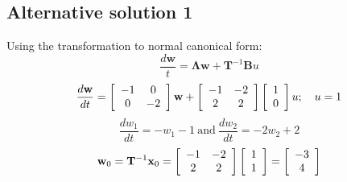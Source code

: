  

\subsection*{Alternative solution 1}
Using the transformation to normal canonical form:
\[
\frac{d\mathbf{w}}{t}=\mathbf{\Lambda w}+ \mathbf{T}^{-1}\mathbf{B}u
\]
\[
\frac{{d{\bf{w}}}}{{dt}} = \left[ {\begin{array}{*{20}c}
   { - 1} & 0  \\
   0 & { - 2}  \\
\end{array}} \right]{\bf{w}} + \left[ {\begin{array}{*{20}c}
   { - 1} & { - 2}  \\
   2 & 2  \\
\end{array}} \right]\left[ {\begin{array}{*{20}c}
   1  \\
   0  \\
\end{array}} \right]u;\quad u = 1
\]
\[
\frac{dw_1}{dt}=-w_1-1\ \textrm{and}\ \frac{dw_2}{dt}=-2w_2 + 2
\]
\[
{\bf{w}}_0  = {\bf{T}}^{ - 1} {\bf{x}}_0  = \left[ {\begin{array}{*{20}c}
   { - 1} & { - 2}  \\
   2 & 2  \\
\end{array}} \right]\left[ {\begin{array}{*{20}c}
   1  \\
   1  \\
\end{array}} \right] = \left[ {\begin{array}{*{20}c}
   { - 3}  \\
   4  \\
\end{array}} \right]
\]


